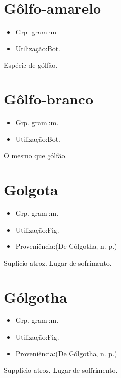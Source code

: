 \section{Gôlfo-amarelo}
\begin{itemize}
\item {Grp. gram.:m.}
\end{itemize}
\begin{itemize}
\item {Utilização:Bot.}
\end{itemize}
Espécie de gólfão.
\section{Gôlfo-branco}
\begin{itemize}
\item {Grp. gram.:m.}
\end{itemize}
\begin{itemize}
\item {Utilização:Bot.}
\end{itemize}
O mesmo que \textunderscore gólfão\textunderscore .
\section{Golgota}
\begin{itemize}
\item {Grp. gram.:m.}
\end{itemize}
\begin{itemize}
\item {Utilização:Fig.}
\end{itemize}
\begin{itemize}
\item {Proveniência:(De \textunderscore Gólgotha\textunderscore , n. p.)}
\end{itemize}
Suplicio atroz.
Lugar de sofrimento.
\section{Gólgotha}
\begin{itemize}
\item {Grp. gram.:m.}
\end{itemize}
\begin{itemize}
\item {Utilização:Fig.}
\end{itemize}
\begin{itemize}
\item {Proveniência:(De \textunderscore Gólgotha\textunderscore , n. p.)}
\end{itemize}
Supplicio atroz.
Lugar de soffrimento.
